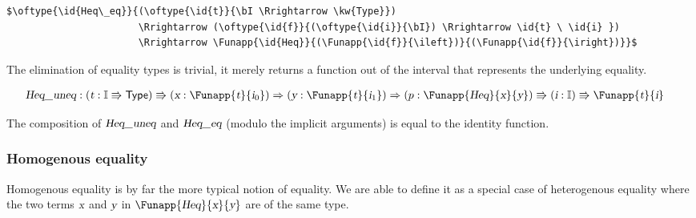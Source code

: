\documentclass[11pt]{article}
\newcommand \kw[1] {\textsf{#1}}
\newcommand \id[1] {\textsl{#1}}
\begin{document}

\begin{lstlisting}
$\oftype{\id{Heq\_eq}}{(\oftype{\id{t}}{\bI \Rrightarrow \kw{Type}})
		               \Rrightarrow (\oftype{\id{f}}{(\oftype{\id{i}}{\bI}) \Rrightarrow \id{t} \ \id{i} })
		               \Rrightarrow \Funapp{\id{Heq}}{(\Funapp{\id{f}}{\ileft})}{(\Funapp{\id{f}}{\iright})}}$
\end{lstlisting}

The elimination of equality types is trivial, it merely returns a function out of the interval that represents the underlying equality.

\begin{align*}
\id{Heq\_uneq} & : (\oftype{\id{t}}{\bI \Rrightarrow \kw{Type}})
			       \Rrightarrow (\oftype{\id{x}}{\Funapp{\id{t}}{\ileft}})
			       \Rightarrow (\oftype{\id{y}}{\Funapp{\id{t}}{\iright}})
			       \Rightarrow (\oftype{p}{\Funapp{\id{Heq}}{\id{x}}{\id{y}}})
			       \Rrightarrow (\oftype{\id{i}}{\bI}) \Rrightarrow \Funapp{\id{t}}{\id{i}}
\end{align*}

The composition of $\id{Heq\_uneq}$ and  $\id{Heq\_eq}$ (modulo the implicit arguments) is equal to the identity function.

\subsubsection{Homogenous equality}
Homogenous equality is by far the more typical notion of equality. We are able to define it as a special case of heterogenous equality where the two terms $\id{x}$ and $\id{y}$ in $\Funapp{\id{Heq}}{\id{x}}{\id{y}}$ are of the same type.
\end{document}
